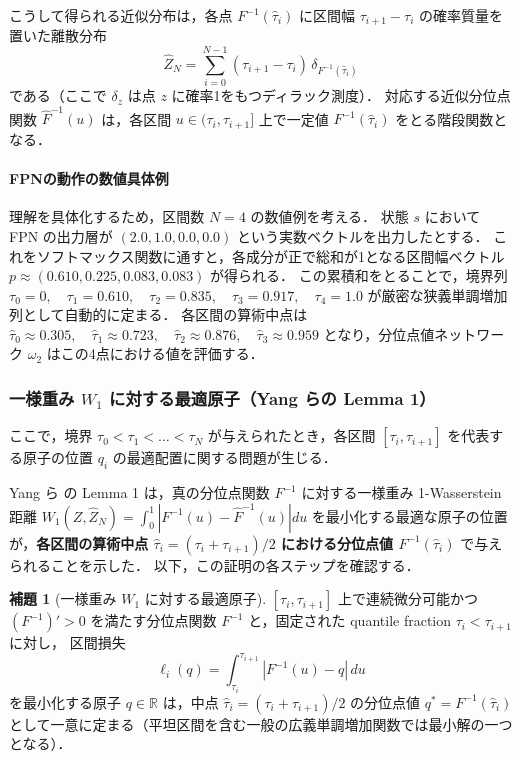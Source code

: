 \documentclass[a4paper,10pt]{jsarticle}
\theoremstyle{definition}
\newtheorem{lemma}{補題}[section]
\newcommand{\Wone}{W_1}
\renewcommand{\Finv}{F^{-1}}
\newcommand{\Fhinv}{\hat{F}^{-1}}
\newcommand{\R}{\mathbb{R}}
\begin{document}
こうして得られる近似分布は，各点 $\Finv(\hat\tau_i)$ に区間幅 $\tau_{i+1}-\tau_i$ の確率質量を置いた離散分布
\begin{equation}
  \hat Z_N = \sum_{i=0}^{N-1}(\tau_{i+1}-\tau_i)\,\delta_{\Finv(\hat\tau_i)}
  \label{eq:zhat_detailed}
\end{equation}
である（ここで $\delta_z$ は点 $z$ に確率1をもつディラック測度）．
対応する近似分位点関数 $\Fhinv(u)$ は，各区間 $u \in (\tau_i, \tau_{i+1}]$ 上で一定値 $\Finv(\hat\tau_i)$ をとる階段関数となる．
\paragraph{FPNの動作の数値具体例}
理解を具体化するため，区間数 $N=4$ の数値例を考える．
状態 $s$ において FPN の出力層が $(2.0, 1.0, 0.0, 0.0)$ という実数ベクトルを出力したとする．
これをソフトマックス関数に通すと，各成分が正で総和が1となる区間幅ベクトル
$p \approx (0.610, 0.225, 0.083, 0.083)$
が得られる．
この累積和をとることで，境界列
$\tau_0 = 0,\quad \tau_1 = 0.610,\quad \tau_2 = 0.835,\quad \tau_3 = 0.917,\quad \tau_4 = 1.0$
が厳密な狭義単調増加列として自動的に定まる．
各区間の算術中点は
$\hat\tau_0 \approx 0.305,\quad \hat\tau_1 \approx 0.723,\quad \hat\tau_2 \approx 0.876,\quad \hat\tau_3 \approx 0.959$
となり，分位点値ネットワーク $\omega_2$ はこの4点における値を評価する．


\subsubsection{一様重み $W_1$ に対する最適原子（Yang らの Lemma 1）}
ここで，境界 $\tau_0 < \tau_1 < \dots < \tau_N$ が与えられたとき，各区間 $[\tau_i, \tau_{i+1}]$ を代表する原子の位置 $q_i$ の最適配置に関する問題が生じる．

Yang ら \cite{yang2019fqf} の Lemma 1 は，真の分位点関数 $\Finv$ に対する一様重み 1-Wasserstein 距離 $\Wone(Z, \hat Z_N) = \int_0^1 |\Finv(u) - \Fhinv(u)| du$ を最小化する最適な原子の位置が，\textbf{各区間の算術中点 $\hat\tau_i = (\tau_i + \tau_{i+1})/2$ における分位点値 $\Finv(\hat\tau_i)$} で与えられることを示した．
以下，この証明の各ステップを確認する．

\begin{lemma}[一様重み $W_1$ に対する最適原子]
\label{lem:fqf-atom}
$[\tau_i, \tau_{i+1}]$ 上で連続微分可能かつ $(\Finv)'>0$ を満たす分位点関数 $\Finv$ と，固定された quantile fraction $\tau_i < \tau_{i+1}$ に対し，
区間損失
\begin{equation}
  \ell_i(q) = \int_{\tau_i}^{\tau_{i+1}} |\Finv(u) - q|\,du
  \label{eq:lem1-loss}
\end{equation}
を最小化する原子 $q \in \R$ は，中点 $\hat\tau_i = (\tau_i + \tau_{i+1})/2$ の分位点値 $q^* = \Finv(\hat\tau_i)$ として一意に定まる（平坦区間を含む一般の広義単調増加関数では最小解の一つとなる）．
\end{lemma}
\end{document}
